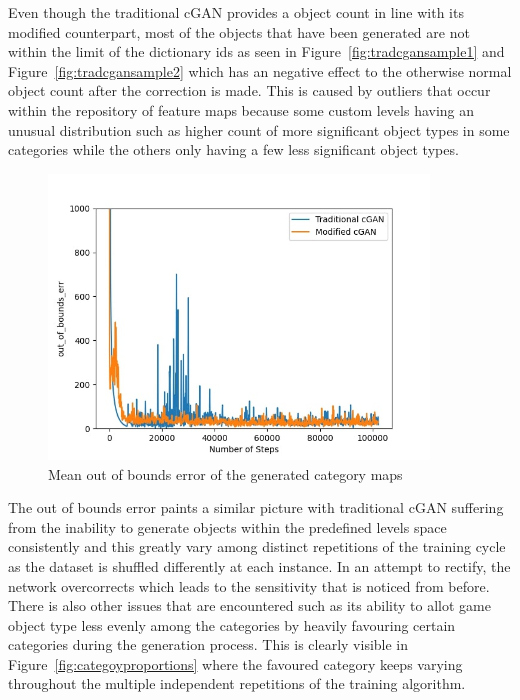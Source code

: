 \documentclass{Configuration_Files/PoliMi3i_thesis}
\begin{document}
Even though the traditional cGAN provides a object count in line with its modified 
counterpart, most of the objects that have been generated are not within the limit of 
the dictionary ids as seen in Figure~\ref{fig:tradcgansample1} and Figure~\ref{fig:tradcgansample2} 
which has an negative effect to the otherwise normal object count
after the correction is made. This is caused by outliers that occur within the repository of 
feature maps because some custom levels having an unusual distribution such 
as higher count of more significant object types in some categories while the others 
only having a few less significant object types.
\begin{figure}[H]
    \centering
    \includegraphics[width=0.9\textwidth]{oob_err.jpg}
    \caption{Mean out of bounds error of the generated category maps}
    \label{fig:ooberror}
\end{figure}
The out of bounds error paints a similar picture with traditional cGAN suffering from 
the inability to generate objects within the predefined levels space consistently and 
this greatly vary among distinct repetitions of the training cycle as the dataset is 
shuffled differently at each instance. In an attempt to rectify, the network 
overcorrects which leads to the sensitivity that is noticed from before. There is also 
other issues that are encountered such as its ability to allot game object type less
evenly among the categories by heavily favouring certain categories during the 
generation process. This is clearly visible in Figure~\ref{fig:categoyproportions} where the favoured category 
keeps varying throughout the multiple independent repetitions of the training algorithm.
\newpage
\end{document}
